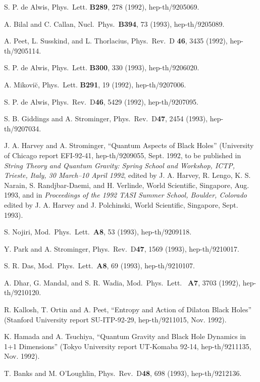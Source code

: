 \documentclass[12pt]{article}
\begin{document}
\begin{thebibliography}{999}
 S. P. de Alwis, Phys.\ Lett. {\bf B289}, 278 (1992),
hep-th/9205069.

 A. Bilal and C. Callan, Nucl.\ Phys.\ {\bf B394}, 73
(1993),
hep-th/9205089.

 A. Peet, L. Susskind, and L. Thorlacius, Phys.\ Rev.\
D{\bf
46},
3435 (1992), hep-th/9205114.

 S. P. de Alwis, Phys.\ Lett. {\bf B300}, 330 (1993),
hep-th/9206020.

 A. Mikovi\u{c}, Phys.\ Lett. {\bf B291}, 19 (1992),
hep-th/9207006.

 S. P. de Alwis, Phys.\ Rev.\ D{\bf 46}, 5429 (1992),
hep-th/9207095.

 S. B. Giddings and A. Strominger, Phys.\ Rev.\
D{\bf 47},
2454 (1993), hep-th/9207034.

 J. A. Harvey and A. Strominger, ``Quantum Aspects of
Black
Holes''
(University of Chicago report EFI-92-41, hep-th/9209055, Sept. 1992,
to be
published in {\em String Theory and Quantum Gravity:  Spring School
and
Workshop, ICTP, Trieste, Italy, 30 March--10 April 1992}, edited by
J. A.
Harvey, R. Lengo, K. S. Narain, S. Randjbar-Daemi, and H. Verlinde,
World Scientific, Singapore, Aug. 1993,
and in {\em Proceedings of the 1992 TASI Summer
School, Boulder, Colorado} edited by J. A. Harvey and J. Polchinski,
World Scientific, Singapore, Sept. 1993).

 S. Nojiri, Mod.\ Phys.\ Lett.\ {\bf A8}, 53 (1993),
hep-th/9209118.

 Y. Park and A. Strominger, Phys.\ Rev.\ D{\bf 47},
1569
(1993),
hep-th/9210017.

 S. R. Das, Mod.\ Phys.\ Lett.\ {\bf A8}, 69 (1993),
hep-th/9210107.

 A. Dhar, G. Mandal, and S. R. Wadia, Mod.\ Phys.\
Lett.\ {\bf
A7},
3703 (1992), hep-th/9210120.

 R. Kallosh, T. Ortin and A. Peet, ``Entropy and Action
of Dilaton Black Holes'' (Stanford University report SU-ITP-92-29,
hep-th/9211015,
Nov. 1992).

 K. Hamada and A. Tsuchiya, ``Quantum Gravity and Black
Hole
Dynamics in 1+1 Dimensions'' (Tokyo University report UT-Komaba
92-14,
hep-th/9211135, Nov. 1992).

 T. Banks and M. O'Loughlin,  Phys.\ Rev.\ D{\bf 48},
698
(1993),
hep-th/9212136.


\end{thebibliography}
\end{document}
